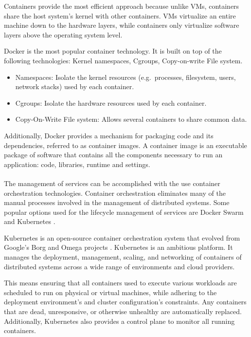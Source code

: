Containers provide the most efficient approach because unlike VMs, containers share the host system’s kernel with other containers.
VMs virtualize an entire machine down to the hardware layers, while containers only virtualize software layers above the operating system level.

Docker \cite{docker} is the most popular container technology. It is built on top of the following technologies: Kernel namespaces, Cgroups, Copy-on-write File system.
\begin{itemize}
    \item Namespaces: Isolate the kernel resources (e.g.\ processes, filesystem, users, network stacks) used by each container.
    \item Cgroups: Isolate the hardware resources used by each container.
    \item Copy-On-Write File system: Allows several containers to share common data.
\end{itemize}

Additionally, Docker provides a mechanism for packaging code and its dependencies, referred to as container images.
A container image is an executable package of software that contains all the components necessary to run an application: code, libraries, runtime and settings.

\paragraph{}

The management of services can be accomplished with the use container orchestration technologies.
Container orchestration eliminates many of the manual processes involved in the management of distributed systems.
Some popular options used for the lifecycle management of services are Docker Swarm \cite{docker2016swarm} and Kubernetes \cite{kubernetes}.

Kubernetes \cite{kubernetes} is an open-source container orchestration system that evolved from Google's Borg and Omega projects \cite{burns2016borg}.
Kubernetes is an ambitious platform. It manages the deployment, management, scaling, and networking of containers of distributed systems across a wide range of environments
and cloud providers.

This means ensuring that all containers used to execute various workloads are scheduled to run on physical or virtual machines,
while adhering to the deployment environment's and cluster configuration's constraints.
Any containers that are dead, unresponsive, or otherwise unhealthy are automatically replaced.
Additionally, Kubernetes also provides a control plane to monitor all running containers.

